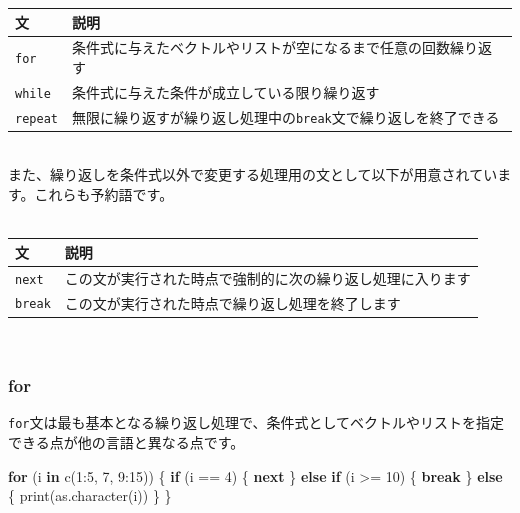\documentclass[
  12pt,
]{book}
\newenvironment{Shaded}{\begin{snugshade}}{\end{snugshade}}
\newcommand{\ControlFlowTok}[1]{\textcolor[rgb]{0.13,0.29,0.53}{\textbf{#1}}}
\newcommand{\DecValTok}[1]{\textcolor[rgb]{0.00,0.00,0.81}{#1}}
\newcommand{\FunctionTok}[1]{\textcolor[rgb]{0.00,0.00,0.00}{#1}}
\newcommand{\NormalTok}[1]{#1}
\newcommand{\SpecialCharTok}[1]{\textcolor[rgb]{0.00,0.00,0.00}{#1}}
\begin{document}
\begin{longtable}[]{@{}ll@{}}
\toprule
文 & 説明 \\
\midrule
\endhead
\texttt{for} & 条件式に与えたベクトルやリストが空になるまで任意の回数繰り返す \\
\texttt{while} & 条件式に与えた条件が成立している限り繰り返す \\
\texttt{repeat} & 無限に繰り返すが繰り返し処理中の\texttt{break}文で繰り返しを終了できる \\
\bottomrule
\end{longtable}

　\\
また、繰り返しを条件式以外で変更する処理用の文として以下が用意されています。これらも予約語です。\\
　

\begin{longtable}[]{@{}ll@{}}
\toprule
文 & 説明 \\
\midrule
\endhead
\texttt{next} & この文が実行された時点で強制的に次の繰り返し処理に入ります \\
\texttt{break} & この文が実行された時点で繰り返し処理を終了します \\
\bottomrule
\end{longtable}

　

\hypertarget{for}{%
\subsubsection{for}\label{for}}

\texttt{for}文は最も基本となる繰り返し処理で、条件式としてベクトルやリストを指定できる点が他の言語と異なる点です。

\begin{Shaded}
\begin{Highlighting}[numbers=left,,]
\ControlFlowTok{for}\NormalTok{ (i }\ControlFlowTok{in} \FunctionTok{c}\NormalTok{(}\DecValTok{1}\SpecialCharTok{:}\DecValTok{5}\NormalTok{, }\DecValTok{7}\NormalTok{, }\DecValTok{9}\SpecialCharTok{:}\DecValTok{15}\NormalTok{)) \{}
  \ControlFlowTok{if}\NormalTok{ (i }\SpecialCharTok{==} \DecValTok{4}\NormalTok{) \{}
    \ControlFlowTok{next}
\NormalTok{  \} }\ControlFlowTok{else} \ControlFlowTok{if}\NormalTok{ (i }\SpecialCharTok{\textgreater{}=} \DecValTok{10}\NormalTok{) \{}
    \ControlFlowTok{break}
\NormalTok{  \} }\ControlFlowTok{else}\NormalTok{ \{}
    \FunctionTok{print}\NormalTok{(}\FunctionTok{as.character}\NormalTok{(i))}
\NormalTok{  \}}
\NormalTok{\}}
\end{Highlighting}
\end{Shaded}
\end{document}
